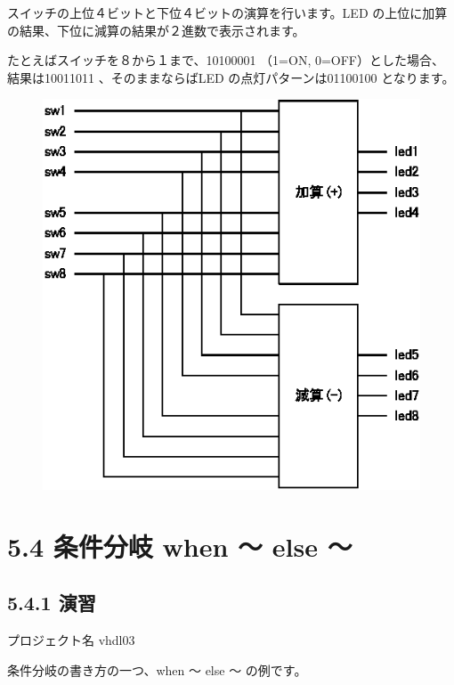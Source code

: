 \documentclass[letterpaper,10pt,dvipdfmx]{sphinxmanual}
\begin{document}
スイッチの上位４ビットと下位４ビットの演算を行います。LED の上位に加算の結果、下位に減算の結果が２進数で表示されます。

たとえばスイッチを８から１まで、10100001 （1=ON, 0=OFF）とした場合、結果は10011011 、そのままならばLED の点灯パターンは01100100 となります。
\begin{figure}[htbp]
\centering

\includegraphics{figure07.eps}
\end{figure}


\section{5.4 条件分岐 when ～ else ～}
\label{05_try:when-else}

\subsection{5.4.1 演習}
\label{05_try:id7}
プロジェクト名 vhdl03

条件分岐の書き方の一つ、when ～ else ～ の例です。
\end{document}
